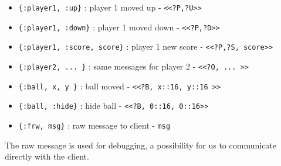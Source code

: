 \documentclass[a4paper,11pt]{article}
\begin{document}
\begin{itemize}
\item {\tt \{:player1, :up\}}  : player 1 moved up -  {\tt <<?P,?U>>}
\item {\tt \{:player1, :down\}}  : player 1 moved down - {\tt <<?P,?D>>}
\item {\tt \{:player1, :score, score\}}  : player 1 new score - {\tt <<?P,?S, score>>}
\item {\tt \{:player2, ... \}} : same messages for player 2 -  {\tt <<?O, ... >>}        
\item {\tt \{:ball, x, y \}} : ball moved  - {\tt <<?B, x::16, y::16 >>}        
\item {\tt \{:ball, :hide\}} : hide ball - {\tt <<?B, 0::16, 0::16>>}        
\item {\tt \{:frw, msg\}}  : raw message to client - {\tt msg}
\end{itemize}

The raw message is used for debugging, a possibility for us to
communicate directly with the client.
\end{document}
